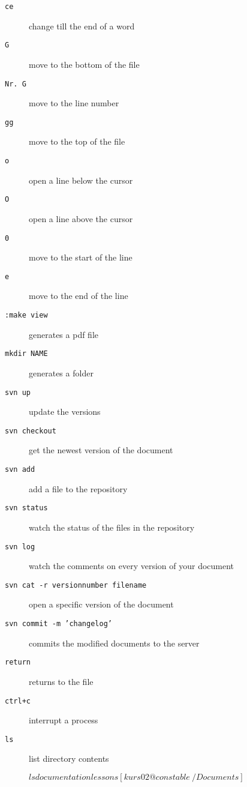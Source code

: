 \documentclass[10pt,a4paper]{scrartcl}
\begin{document}
\begin{description}
\item[\texttt{ce}]change till the end of a word

\item[\texttt{G}]move to the bottom of the file

\item[\texttt{Nr. G}]move to the line number

\item[\texttt{gg}]move to the top of the file

\item[\texttt{o}]open a line below the cursor

\item[\texttt{O}]open a line above the cursor

\item[\texttt{0}]move to the start of the line

\item[\texttt{e}]move to the end of the line

\item[\texttt{:make view}]generates a pdf file

\item[\texttt{mkdir NAME}]generates a folder

\item[\texttt{svn up}]update the versions

\item[\texttt{svn checkout}]get the newest version of the document

\item[\texttt{svn add}]add a file to the repository

\item[\texttt{svn status}]watch the status of the files in the repository

\item[\texttt{svn log}]watch the comments on every version of your document

\item[\texttt{svn cat -r versionnumber filename}]open a specific version of the document

\item[\texttt{svn commit -m 'changelog'}]commits the modified documents to the server

\item[\texttt{return}]returns to the file

\item[\texttt{ctrl+c}]interrupt a process

\item[\texttt{ls}]list directory contents
    \begin{terminalcode}
$ ls
documentation  lessons
[kurs02@constable ~/Documents]$ 
    \end{terminalcode}


\end{description}
\end{document}
